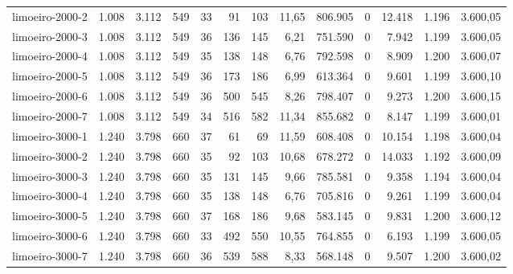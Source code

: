 \begin{table}[ht!]
{\begin{tabular}{lrrrrrrrrrrrr}
			\rowcolor{rowlight}limoeiro-2000-2                                                       & 1.008 & 3.112 & 549 & 33 & 91  & 103 & 11,65 & 806.905   & 0 & 12.418 & 1.196 & 3.600,05 \\
			\rowcolor{rowlight}limoeiro-2000-3                                                       & 1.008 & 3.112 & 549 & 36 & 136 & 145 & 6,21  & 751.590   & 0 & 7.942  & 1.199 & 3.600,05 \\
			\rowcolor{rowlight}limoeiro-2000-4                                                       & 1.008 & 3.112 & 549 & 35 & 138 & 148 & 6,76  & 792.598   & 0 & 8.909  & 1.200 & 3.600,07 \\
			\rowcolor{rowlight}limoeiro-2000-5                                                       & 1.008 & 3.112 & 549 & 36 & 173 & 186 & 6,99  & 613.364   & 0 & 9.601  & 1.199 & 3.600,10 \\
			\rowcolor{rowlight}limoeiro-2000-6                                                       & 1.008 & 3.112 & 549 & 36 & 500 & 545 & 8,26  & 798.407   & 0 & 9.273  & 1.200 & 3.600,15 \\
			\rowcolor{rowlight}limoeiro-2000-7                                                       & 1.008 & 3.112 & 549 & 34 & 516 & 582 & 11,34 & 855.682   & 0 & 8.147  & 1.199 & 3.600,01 \\
			\rowcolor{rowlight}limoeiro-3000-1                                                       & 1.240 & 3.798 & 660 & 37 & 61  & 69  & 11,59 & 608.408   & 0 & 10.154 & 1.198 & 3.600,04 \\
			\rowcolor{rowlight}limoeiro-3000-2                                                       & 1.240 & 3.798 & 660 & 35 & 92  & 103 & 10,68 & 678.272   & 0 & 14.033 & 1.192 & 3.600,09 \\
			\rowcolor{rowlight}limoeiro-3000-3                                                       & 1.240 & 3.798 & 660 & 35 & 131 & 145 & 9,66  & 785.581   & 0 & 9.358  & 1.194 & 3.600,04 \\
			\rowcolor{rowlight}limoeiro-3000-4                                                       & 1.240 & 3.798 & 660 & 35 & 138 & 148 & 6,76  & 705.816   & 0 & 9.261  & 1.199 & 3.600,04 \\
			\rowcolor{rowlight}limoeiro-3000-5                                                       & 1.240 & 3.798 & 660 & 37 & 168 & 186 & 9,68  & 583.145   & 0 & 9.831  & 1.200 & 3.600,12 \\
			\rowcolor{rowlight}limoeiro-3000-6                                                       & 1.240 & 3.798 & 660 & 33 & 492 & 550 & 10,55 & 764.855   & 0 & 6.193  & 1.199 & 3.600,05 \\
			\rowcolor{rowlight}limoeiro-3000-7                                                       & 1.240 & 3.798 & 660 & 36 & 539 & 588 & 8,33  & 568.148   & 0 & 9.507  & 1.200 & 3.600,02 \\ \bottomrule
		\end{tabular}%
	}
\end{table}


